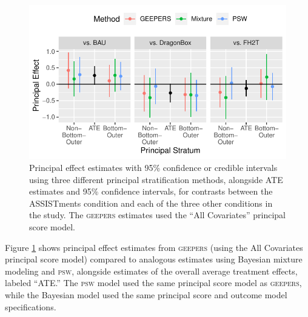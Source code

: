\documentclass[]{article}
\begin{document}

\begin{figure}
  \centering
  \includegraphics{compareMethods.pdf}
  \caption{Principal effect estimates with 95\% confidence or credible intervals using three different principal stratification methods, alongside ATE estimates and 95\% confidence intervals, for contrasts between the ASSISTments condition and each of the three other conditions in the study. The \textsc{geepers} estimates used the ``All Covariates'' principal score model.}
  \label{fig:compare}
\end{figure}

Figure \ref{fig:compare} shows principal effect estimates from \textsc{geepers} (using the All Covariates principal score model) compared to analogous estimates using Bayesian mixture modeling and \textsc{psw}, alongside estimates of the overall average treatment effects, labeled ``ATE.''
The \textsc{psw} model used the same principal score model as \textsc{geepers}, while the Bayesian model used the same principal score and outcome model specifications.
\end{document}
